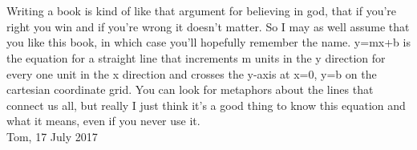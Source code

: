 
\chapter*{} %

Writing a book is kind of like that argument for believing in god, that if you're right you win and if you're wrong it doesn't matter. So I may as well assume that you like this book, in which case you'll hopefully remember the name. y=mx+b is the equation for a straight line that increments m units in the y direction for every one unit in the x direction and crosses the y-axis at x=0, y=b on the cartesian coordinate grid. You can look for metaphors about the lines that connect us all, but really I just think it's a good thing to know this equation and what it means, even if you never use it. \\

Tom, 17 July 2017

%
%
